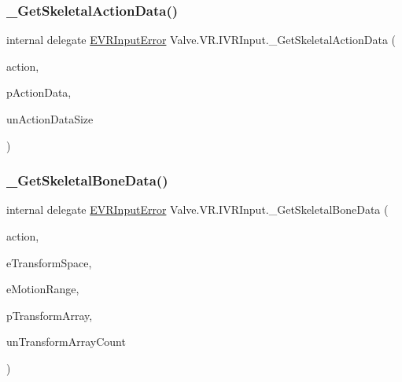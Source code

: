 \subsubsection{\texorpdfstring{\_GetSkeletalActionData()}{\_GetSkeletalActionData()}}
{\footnotesize\ttfamily internal delegate \mbox{\hyperlink{namespace_valve_1_1_v_r_a592d7f4189b8346d6c96dbdbaa35bc1b}{E\+V\+R\+Input\+Error}} Valve.\+V\+R.\+I\+V\+R\+Input.\+\_\+\+Get\+Skeletal\+Action\+Data (\begin{DoxyParamCaption}\item[{ulong}]{action,  }\item[{ref \mbox{\hyperlink{struct_valve_1_1_v_r_1_1_input_skeletal_action_data__t}{Input\+Skeletal\+Action\+Data\+\_\+t}}}]{p\+Action\+Data,  }\item[{uint}]{un\+Action\+Data\+Size }\end{DoxyParamCaption})}

\mbox{\label{struct_valve_1_1_v_r_1_1_i_v_r_input_a51bb3d46fb9a17ce1918475f0e1f0f3f}} 
\subsubsection{\texorpdfstring{\_GetSkeletalBoneData()}{\_GetSkeletalBoneData()}}
{\footnotesize\ttfamily internal delegate \mbox{\hyperlink{namespace_valve_1_1_v_r_a592d7f4189b8346d6c96dbdbaa35bc1b}{E\+V\+R\+Input\+Error}} Valve.\+V\+R.\+I\+V\+R\+Input.\+\_\+\+Get\+Skeletal\+Bone\+Data (\begin{DoxyParamCaption}\item[{ulong}]{action,  }\item[{\mbox{\hyperlink{namespace_valve_1_1_v_r_a916744fb3fc7b8e8ba224fba9bee6de4}{E\+V\+R\+Skeletal\+Transform\+Space}}}]{e\+Transform\+Space,  }\item[{\mbox{\hyperlink{namespace_valve_1_1_v_r_affc8d18345f8f5d36f1ae7b4ce534500}{E\+V\+R\+Skeletal\+Motion\+Range}}}]{e\+Motion\+Range,  }\item[{\mbox{[}\+In, Out\mbox{]} \mbox{\hyperlink{struct_valve_1_1_v_r_1_1_v_r_bone_transform__t}{V\+R\+Bone\+Transform\+\_\+t}} \mbox{[}$\,$\mbox{]}}]{p\+Transform\+Array,  }\item[{uint}]{un\+Transform\+Array\+Count }\end{DoxyParamCaption})}

